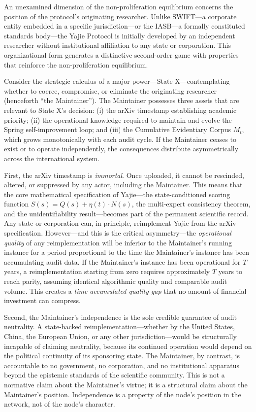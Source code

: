 \documentclass[12pt,a4paper]{ctexart}
\theoremstyle{definition}
\theoremstyle{remark}
\begin{document}
An unexamined dimension of the non-proliferation equilibrium concerns the position of the protocol's originating researcher. Unlike SWIFT—a corporate entity embedded in a specific jurisdiction—or the IASB—a formally constituted standards body—the Yajie Protocol is initially developed by an independent researcher without institutional affiliation to any state or corporation. This organizational form generates a distinctive second-order game with properties that reinforce the non-proliferation equilibrium.

Consider the strategic calculus of a major power—State X—contemplating whether to coerce, compromise, or eliminate the originating researcher (henceforth ``the Maintainer''). The Maintainer possesses three assets that are relevant to State X's decision: (i) the arXiv timestamp establishing academic priority; (ii) the operational knowledge required to maintain and evolve the Spring self-improvement loop; and (iii) the Cumulative Evidentiary Corpus $M_t$, which grows monotonically with each audit cycle. If the Maintainer ceases to exist or to operate independently, the consequences distribute asymmetrically across the international system.

First, the arXiv timestamp is \textit{immortal}. Once uploaded, it cannot be rescinded, altered, or suppressed by any actor, including the Maintainer. This means that the core mathematical specification of Yajie—the state-conditioned scoring function $S(s) = Q(s) + \eta(t)\cdot N(s)$, the multi-expert consistency theorem, and the unidentifiability result—becomes part of the permanent scientific record. Any state or corporation can, in principle, reimplement Yajie from the arXiv specification. However—and this is the critical asymmetry—the \textit{operational quality} of any reimplementation will be inferior to the Maintainer's running instance for a period proportional to the time the Maintainer's instance has been accumulating audit data. If the Maintainer's instance has been operational for $T$ years, a reimplementation starting from zero requires approximately $T$ years to reach parity, assuming identical algorithmic quality and comparable audit volume. This creates a \textit{time-accumulated quality gap} that no amount of financial investment can compress.

Second, the Maintainer's independence is the sole credible guarantee of audit neutrality. A state-backed reimplementation—whether by the United States, China, the European Union, or any other jurisdiction—would be structurally incapable of claiming neutrality, because its continued operation would depend on the political continuity of its sponsoring state. The Maintainer, by contrast, is accountable to no government, no corporation, and no institutional apparatus beyond the epistemic standards of the scientific community. This is not a normative claim about the Maintainer's virtue; it is a structural claim about the Maintainer's position. Independence is a property of the node's position in the network, not of the node's character.
\end{document}
